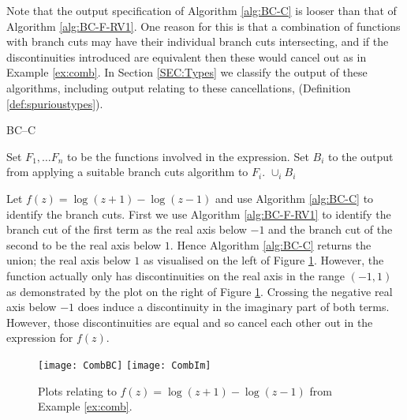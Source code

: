 \documentclass{llncs}
\begin{document}
Note that the output specification of Algorithm \ref{alg:BC-C} is looser than that of Algorithm \ref{alg:BC-F-RV1}.  One reason for this is that a combination of functions with branch cuts may have their individual branch cuts intersecting, and if the discontinuities introduced are equivalent then these would cancel out as in Example \ref{ex:comb}.  In Section \ref{SEC:Types} we classify the output of these algorithms, including output relating to these cancellations, (Definition \ref{def:spurioustypes}).
 
\begin{algorithm}[ht] \caption{BC--C} \label{alg:BC-C}
\DontPrintSemicolon
{}
\BlankLine
Set $F_1, \dots F_n$ to be the functions involved in the expression. \;
{Set $B_i$ to the output from applying a suitable branch cuts algorithm to $F_i$.}
\Return $\cup_i B_i$ 
\end{algorithm}

\begin{example} \label{ex:comb}
Let $f(z)=\log(z+1) - \log(z-1)$ and use Algorithm \ref{alg:BC-C} to identify the branch cuts.  First we use Algorithm \ref{alg:BC-F-RV1} to identify the branch cut of the first term as the real axis below $-1$ and the branch cut of the second to be the real axis below $1$.  Hence Algorithm \ref{alg:BC-C} returns the union; the real axis below $1$ as visualised on the left of Figure \ref{fig:comb}.  However, the function actually only has discontinuities on the real axis in the range $(-1,1)$ as demonstrated by the plot on the right of Figure \ref{fig:comb}.  Crossing the negative real axis below $-1$ does induce a discontinuity in the imaginary part of both terms.  However, those discontinuities are equal and so cancel each other out in the expression for $f(z)$.
\end{example}

\begin{figure}[ht]
\begin{center}
\texttt{[image: CombBC]}
\hspace*{0.3cm}
\texttt{[image: CombIm]}
\end{center}
\caption{Plots relating to $f(z)=\log(z+1) - \log(z-1)$ from Example \ref{ex:comb}.} 
\label{fig:comb}
\end{figure}
\end{document}
